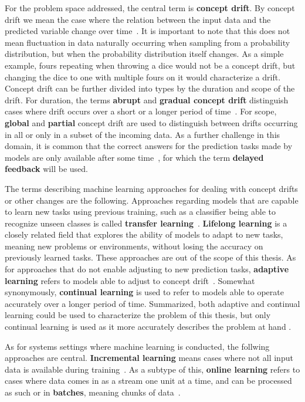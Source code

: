 For the problem space addressed, the central term is \textbf{concept drift}. By concept drift we mean the case where the relation between the input
data and the predicted variable change over time~\cite{conceptdriftsurvey}. It is important to note that this does not mean fluctuation in data naturally occurring when sampling from a probability distribution, but when the probability distribution itself changes. As a simple example, fours repeating when throwing a dice would not be a concept drift, but changing the dice to one with multiple fours on it would characterize a drift. Concept drift can be further divided into types by the duration and scope of the drift. For duration, the terms \textbf{abrupt} and \textbf{gradual concept drift} distinguish cases where drift occurs over a short or a longer period of time~\cite{zliobaiteAdaptiveTrainingSet2010}. For scope, \textbf{global} and \textbf{partial} concept drift are used to distinguish between drifts occurring in all or only in a subset of the incoming data. As a further challenge in this domain, it is common that the correct answers for the prediction tasks made by models are only available after some time~\cite{delayedlabelstreams}, for which the term  \textbf{delayed feedback} will be used. 

The terms describing machine learning approaches for dealing with concept drifts or other changes are the following. Approaches regarding models that are capable to learn new tasks using previous training, such as a classifier being able to recognize unseen classes is called \textbf{transfer learning}~\cite{iotsurvey}. \textbf{Lifelong learning} is a closely related field that explores the ability of models to adapt to new tasks, meaning new problems or environments, without losing the accuracy on previously learned tasks.  These approaches are out of the scope of this thesis. As for approaches that do not enable adjusting to new prediction tasks, \textbf{adaptive learning} refers to models able to adjust to concept drift~\cite{conceptdriftsurvey}. Somewhat synonymously, \textbf{continual learning} is used to refer to models able to operate accurately over a longer period of time. Summarized, both adaptive and continual learning could be used to characterize the problem of this thesis, but only continual learning is used as it more accurately describes the problem at hand .

As for systems settings where machine learning is conducted, the follwing approaches are central. \textbf{Incremental learning} means cases where not all input data is available during training~\cite{giraud-carrier_note_2000}. As a subtype of this, \textbf{online learning} refers to cases where data comes in as a stream one unit at a time, and can be processed as such or in \textbf{batches}, meaning chunks of data~\cite{conceptdriftsurvey}.

